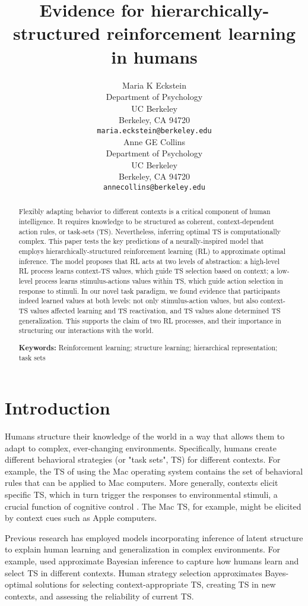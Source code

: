 \documentclass[10pt, letterpaper]{article}
\title{Evidence for hierarchically-structured reinforcement learning in humans}
\author{
  Maria K Eckstein \\
  Department of Psychology \\
  UC Berkeley \\
  Berkeley, CA 94720 \\
  \texttt{maria.eckstein@berkeley.edu} \\  
  \And
  Anne GE Collins \\
  Department of Psychology \\
  UC Berkeley \\
  Berkeley, CA 94720 \\
  \texttt{annecollins@berkeley.edu} \\
}
\begin{document}
\maketitle


\begin{abstract}

Flexibly adapting behavior to different contexts is a critical component of human intelligence. It requires knowledge to be structured as coherent, context-dependent action rules, or task-sets (TS). Nevertheless, inferring optimal TS is computationally complex. This paper tests the key predictions of a neurally-inspired model that employs hierarchically-structured reinforcement learning (RL) to approximate optimal inference. The model proposes that RL acts at two levels of abstraction: a high-level RL process learns context-TS values, which guide TS selection based on context; a low-level process learns stimulus-actions values within TS, which guide action selection in response to stimuli. In our novel task paradigm, we found evidence that participants indeed learned values at both levels: not only stimulus-action values, but also context-TS values affected learning and TS reactivation, and TS values alone determined TS generalization. This supports the claim of two RL processes, and their importance in structuring our interactions with the world.

\textbf{Keywords:} 
Reinforcement learning; structure learning; hierarchical representation; task sets

\end{abstract}


\section{Introduction}

Humans structure their knowledge of the world in a way that allows them to adapt to complex, ever-changing environments. Specifically, humans create different behavioral strategies (or "task sets", TS) for different contexts. For example, the TS of using the Mac operating system contains the set of behavioral rules that can be applied to Mac computers. More generally, contexts elicit specific TS, which in turn trigger the responses to environmental stimuli, a crucial function of cognitive control \cite{miller_integrative_2001}. The Mac TS, for example, might be elicited by context cues such as Apple computers.

Previous research has employed models incorporating inference of latent structure to explain human learning and generalization in complex environments. For example, \cite{collins_reasoning_2012, donoso_foundations_2014} used approximate Bayesian inference to capture how humans learn and select TS in different contexts. Human strategy selection approximates Bayes-optimal solutions for selecting context-appropriate TS, creating TS in new contexts, and assessing the reliability of current TS.
\end{document}
